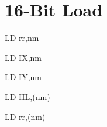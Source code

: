 \section{16-Bit Load}

\begin{instrtable}

	\begin{instruction}{LD rr,nm} 
			\FlagsLDrr
		\SkipToOpCode 
		\SkipToOpCode 
	\end{instruction}

	\begin{instruction}{LD IX,nm} 
			\FlagsLDrr
		\SkipToOpCode 
		\SkipToOpCode 
		\SkipToOpCode 
	\end{instruction}

	\begin{instruction}{LD IY,nm} 
			\FlagsLDrr
		\SkipToOpCode 
		\SkipToOpCode 
		\SkipToOpCode 
	\end{instruction}

	\begin{instruction}{LD HL,(nm)} 
			\FlagsLDrr
		\SkipToSymbol
			\FromSymbolToOpCode
		\SkipToOpCode 
	\end{instruction}

	\begin{instruction}{LD rr,(nm)} 
			\FlagsLDrr
		\SkipToSymbol
			\FromSymbolToOpCode
		\SkipToOpCode 
		\SkipToOpCode 
	\end{instruction}


\end{instrtable}
